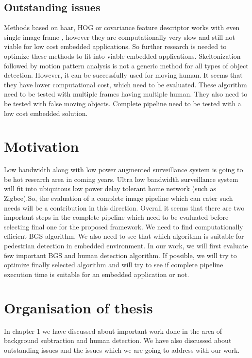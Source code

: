 \subsection{Outstanding issues}
Methods based on haar, HOG or covariance feature descriptor works with
even single image frame , however they are computationally very slow and
still not viable for low cost embedded applications. So further research
is needed to optimize these methods to fit into viable embedded
applications. Skeltonization followed by motion pattern analysis is not
a generic method for all types of object detection. However, it can be
successfully used for moving human. It seems that they have lower
computational cost, which need to be evaluated. These algorithm need to
be tested with multiple frames having multiple human. They also need to
be tested with false moving objects. Complete pipeline need to be tested
with a low cost embedded solution.\\

\section{Motivation}
Low bandwidth along with low power augmented surveillance system is
going to be hot research area in coming years. Ultra low bandwidth
surveillance system will fit into ubiquitous low power delay tolerant
home network (such as Zigbee).So, the evaluation of a complete image
pipeline which can cater such needs will be a contribution in this
direction. Overall it seems that there are two important steps in the
complete pipeline which need to be evaluated before selecting final one
for the proposed framework. We need to find computationally efficient
BGS algorithm. We also need to see that which algorithm is suitable for
pedestrian detection in embedded environment.  In our work, we will
first evaluate few important BGS and human detection algorithm.
If possible, we will try to optimize finally selected algorithm and will
try to see if complete pipeline execution time is suitable for an
embedded application or not.\\

\section{Organisation of thesis}

In chapter 1 we have discussed about important work done in the area of
background subtraction and human detection. We have also discussed about
outstanding issues and the issues which we are going to address with our
work.\\

